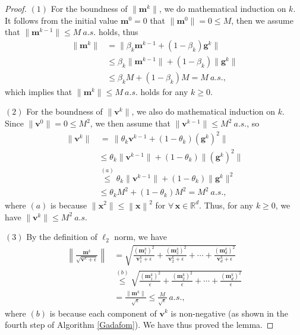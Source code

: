 \documentclass[twoside,11pt]{article}
\begin{document}
\begin{proof}
$(1)$ For the boundness of $\lVert\mathbf{m}^{k}\rVert$, we do mathematical induction on $k$. It follows from the initial value $\mathbf{m}^{0}=0$ that $\lVert\mathbf{m}^0 \rVert=0\le M$, then we assume that $\lVert\mathbf{m}^{k-1} \rVert\le M\ a.s.$ holds, thus
\begin{equation}
	\begin{aligned}
	\lVert \mathbf{m}^{k} \rVert &=\lVert \beta_k \mathbf{m}^{k-1} 
	+ (1-\beta_k)\mathbf{g}^k\rVert\\
	&\le\beta_k
	\lVert\mathbf{m}^{k-1}\rVert
	+(1-\beta_k)\lVert\mathbf{g}^k\rVert\\
	&\le \beta_k M+(1-\beta_k)M=M\ a.s.,\nonumber
	\end{aligned}
\end{equation}
which implies that $\parallel \mathbf{m}^k \parallel\le M\ a.s.$ holds for any $k\ge0$.
	
\par $(2)$ For the boundness of $\lVert \mathbf{v}^{k}\rVert$, we also do mathematical induction on $k$. Since $\lVert\mathbf{v}^0\rVert=0\le M^2$, we then assume that $\lVert \mathbf{v}^{k-1}\rVert\le M^2\ a.s.$, so
\begin{equation}
	\begin{aligned}
	\lVert \mathbf{v}^{k} \rVert
	&\,=\,\lVert  \theta_k\mathbf{v}^{k-1}+(1-\theta_k)(\mathbf{g}^k)^2\rVert
	\\
	&\le \theta_k\lVert \mathbf{v}^{k-1}\rVert
	+(1-\theta_k)\lVert (\mathbf{g}^k)^2 \rVert\\
	&\overset{(a)}{\le}\theta_k\lVert \mathbf{v}^{k-1}\rVert
	+(1-\theta_k)\lVert \mathbf{g}^k \rVert^2
	\\
	&\le\theta_kM^2+(1-\theta_k)M^2=M^2
	\ a.s.,\nonumber
	\end{aligned}
\end{equation}
where $(a)$ is because $\lVert \mathbf{x} ^2\rVert\le\left\|\mathbf{x}\right\|^2$ for $\forall\, \mathbf{x}\in\mathbb{R}^d$. Thus, for any $k\ge0$, we have $\lVert \mathbf{v}^k \rVert\le M^2\ a.s.$
	
\par $(3)$ By the definition of ${\ell}_2$ norm,  we have
\begin{equation}
	\begin{aligned}
	\left\| \frac{\mathbf{m}^k}{\sqrt{\mathbf{v}^k+\epsilon}} \right\|  &=\sqrt{\frac{(\mathbf{m}^k_1)^2}{\mathbf{v}^k_1+\epsilon}+\frac{(\mathbf{m}^k_2)^2}{\mathbf{v}^k_2+\epsilon}+\cdots+\frac{(\mathbf{m}^k_d)^2}{\mathbf{v}^k_d+\epsilon}}\\ &\overset{(b)}{\le}\sqrt{\frac{(\mathbf{m}^k_1)^2}{\epsilon}+\frac{(\mathbf{m}^k_2)^2}{\epsilon}+\cdots+\frac{(\mathbf{m}^k_d)^2}{\epsilon}}
	\\
	&=\frac{\parallel \mathbf{m}^k \parallel}{\sqrt{\epsilon}}\le\frac{M}{\sqrt{\epsilon}}\ a.s.,\nonumber
	\end{aligned}
\end{equation}
where $(b)$ is because  each component of $\mathbf{v}^k$ is non-negative (as shown in the fourth step of Algorithm \ref{Gadafom}). We have thus proved the lemma.
\end{proof}
\end{document}
